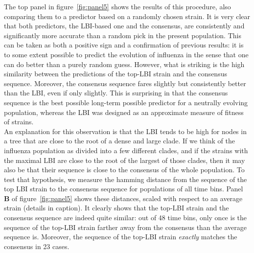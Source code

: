 \documentclass{article}
\begin{document}
	The top panel in figure~\ref{fig:panel5} shows the results of this procedure, also comparing them to a predictor based on a randomly chosen strain. It is very clear that both predictors, the LBI-based one and the consensus, are consistently and significantly more accurate than a random pick in the present population. This can be taken as both a positive sign and a confirmation of previous results: it is to some extent possible to predict the evolution of influenza in the sense that one can do better than a purely random guess. However, what is striking is the high similarity between the predictions of the top-LBI strain and the consensus sequence. Moreover, the consensus sequence fares slightly but consistently better than the LBI, even if only slightly. This is surprising in that the consensus sequence is the best possible long-term possible predictor for a neutrally evolving population, whereas the LBI was designed as an approximate measure of fitness of strains. \\
	An explanation for this observation is that the LBI tends to be high for nodes in a tree that are close to the root of a dense and large clade. If we think of the influenza population as divided into a few different clades, and if the strains with the maximal LBI are close to the root of the largest of those clades, then it may also be that their sequence is close to the consensus of the whole population. To test that hypothesis, we measure the hamming distance from the sequence of the top LBI strain to the consensus sequence for populations of all time bins. Panel \textbf{B} of figure~\ref{fig:panel5} shows these distances, scaled with respect to an average strain (details in caption). It clearly shows that the top-LBI strain and the consensus sequence are indeed quite similar: out of 48 time bins, only once is the sequence of the top-LBI strain farther away from the consensus than the average sequence is. Moreover, the sequence of the top-LBI strain \emph{exactly} matches the consensus in 23 cases. \\
\end{document}
